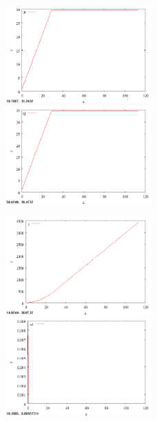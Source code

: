 \documentclass[14pt]{article}
\begin{document}
\begin{figure}
\begin{floatrow}
    {\includegraphics[width=0.5\textwidth]{task4_P}}
    {\includegraphics[width=0.5\textwidth]{task4_Q}}
\end{floatrow}
\end{figure}

\begin{figure}
\begin{floatrow}
    {\includegraphics[width=0.5\textwidth]{task4_y}}
    {\includegraphics[width=0.5\textwidth]{task4_u1}}
\end{floatrow}
\end{figure}
\end{document}

